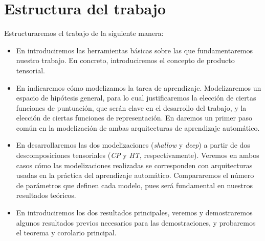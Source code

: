 \section{Estructura del trabajo}

Estructuraremos el trabajo de la siguiente manera:

\begin{itemize}
	\item En  introduciremos las herramientas básicas sobre las que fundamentaremos nuestro trabajo. En concreto, introduciremos el concepto de producto tensorial.
	\item En  indicaremos cómo modelizamos la tarea de aprendizaje. Modelizaremos un espacio de hipótesis general, para lo cual justificaremos la elección de ciertas funciones de puntuación, que serán clave en el desarrollo del trabajo, y la elección de ciertas funciones de representación. En  daremos un primer paso común en la modelización de ambas arquitecturas de aprendizaje automático.
	\item En  desarrollaremos las dos modelizaciones (\textit{shallow} y \textit{deep}) a partir de dos descomposiciones tensoriales (\textit{CP} y \textit{HT}, respectivamente). Veremos en ambos casos cómo las modelizaciones realizadas se corresponden con arquitecturas usadas en la práctica del aprendizaje automático. Compararemos el número de parámetros que definen cada modelo, pues será fundamental en nuestros resultados teóricos.
	\item En  introduciremos los dos resultados principales, veremos y demostraremos algunos resultados previos necesarios para las demostraciones, y probaremos el teorema y corolario principal.
\end{itemize}
